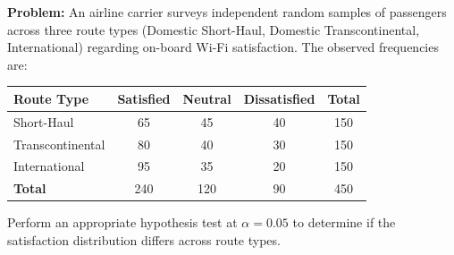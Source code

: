 \begin{frqrubricbox}
\textbf{Problem:} An airline carrier surveys independent random samples of passengers across three route types (Domestic Short-Haul, Domestic Transcontinental, International) regarding on-board Wi-Fi satisfaction. 
The observed frequencies are:
\begin{center}
\begin{tabular}{lcccc}
\toprule
\textbf{Route Type} & \textbf{Satisfied} & \textbf{Neutral} & \textbf{Dissatisfied} & \textbf{Total} \\
\midrule
Short-Haul & 65 & 45 & 40 & 150 \\
Transcontinental & 80 & 40 & 30 & 150 \\
International & 95 & 35 & 20 & 150 \\
\midrule
\textbf{Total} & 240 & 120 & 90 & 450 \\
\bottomrule
\end{tabular}
\end{center}
Perform an appropriate hypothesis test at $\alpha = 0.05$ to determine if the satisfaction distribution differs across route types.


\end{frqrubricbox}
